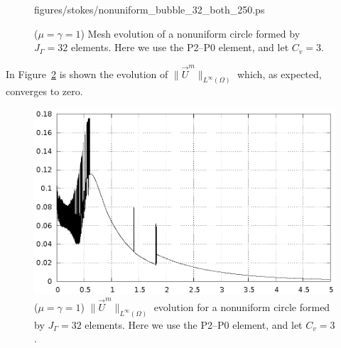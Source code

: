 \begin{figure}[htbp]
{{figures/stokes/nonuniform_bubble_32_both_250.ps}}
\caption[Stokes equidistribution property]
{($\mu=\gamma=1$) Mesh evolution of a nonuniform circle formed by
$J_\Gamma = 32$ elements. Here we use the P2--P0 element, and let $C_v = 3$.}
\label{fig:nonuniform_bubble_32_both}
\end{figure}
In Figure~\ref{fig:nonuniform_bubble_velocity_32_both} is shown the evolution of
$\|\vec U^m\|_{L^\infty(\Omega)}$ which, as expected, converges to zero.
\begin{figure}[htbp]
\centering
\includegraphics[width=.45\textwidth]
{figures/stokes/nonuniform_bubble_velocity_32_both.ps}
\caption[Stokes equidistribution velocity]
{($\mu=\gamma=1$) $\|\vec U^m\|_{L^\infty(\Omega)}$ evolution for a nonuniform
circle formed by $J_\Gamma = 32$ elements. Here we use the P2--P0 element, and
let $C_v = 3$.}
\label{fig:nonuniform_bubble_velocity_32_both}
\end{figure}

